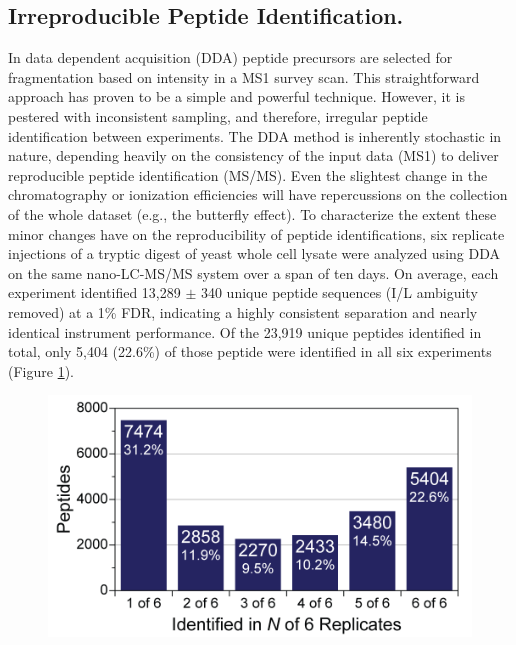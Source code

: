 \subsection*{Irreproducible Peptide Identification.}
In data dependent acquisition (DDA) peptide precursors are selected for fragmentation based on intensity in a MS1 survey scan. This straightforward approach has proven to be a simple and powerful technique. However, it is pestered with inconsistent sampling, and therefore, irregular peptide identification between experiments. The DDA method is inherently stochastic in nature, depending heavily on the consistency of the input data (MS1) to deliver reproducible peptide identification (MS/MS). Even the slightest change in the chromatography or ionization efficiencies will have repercussions on the collection of the whole dataset (e.g., the butterfly effect). To characterize the extent these minor changes have on the reproducibility of peptide identifications, six replicate injections of a tryptic digest of yeast whole cell lysate were analyzed using DDA on the same nano-LC-MS/MS system over a span of ten days. On average, each experiment identified 13,289 $\pm$ 340 unique peptide sequences (I/L ambiguity removed) at a 1\% FDR, indicating a highly consistent separation and nearly identical instrument performance. Of the 23,919 unique peptides identified in total, only 5,404 (22.6\%) of those peptide were identified in all six experiments (Figure \ref{fig:eoa1}).
\begin{figure}
	\centering
	\includegraphics[width=\columnwidth]{eoa/EOA 1.png}
	\label{fig:eoa1}
\end{figure}
